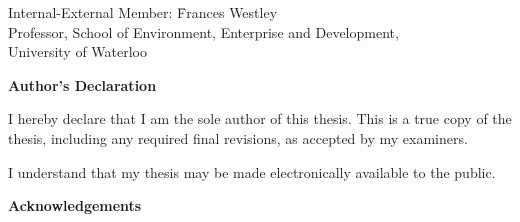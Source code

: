   \noindent
  \begin{tabbing}
Internal-External Member: \=  Frances Westley \\ %
\> Professor, School of Environment, Enterprise and Development, \\
\> University of Waterloo \\
\end{tabbing}
  \bigskip


  

\cleardoublepage
{}    %

 \begin{center}\textbf{Author's Declaration}\end{center}
  
 \noindent
I hereby declare that I am the sole author of this thesis. This is a true copy of the thesis, including any required final revisions, as accepted by my examiners.

  \bigskip
  
  \noindent
I understand that my thesis may be made electronically available to the public.

\cleardoublepage
{}    %




\cleardoublepage
{}    %

\begin{center}\textbf{Acknowledgements}\end{center}

